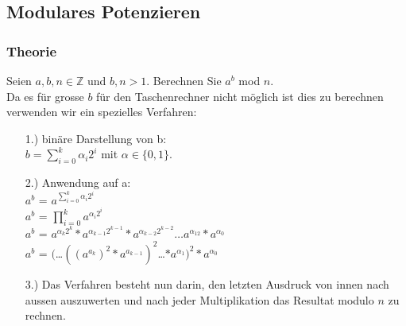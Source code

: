 \documentclass[10pt]{article}
\newcommand{\ZN}{\mathbb{Z}} %
\begin{document}
\subsection{Modulares Potenzieren}
\subsubsection{Theorie}
Seien $a,b,n \in \ZN$ und $b,n > 1$. Berechnen Sie $a^b$ mod $n$. \\
Da es für grosse $b$ für den Taschenrechner nicht möglich ist dies zu berechnen verwenden wir ein spezielles Verfahren:
\begin{itemize}
	\item[1.)] binäre Darstellung von b: \\
		$b=\sum_{i=0}^k \alpha_i2^i$ mit $\alpha \in \{0,1\}$.
	\item[2.)] Anwendung auf a: \\
		$a^b$ = $a^{\sum_{i=0}^k \alpha_i2^i}$\\
		$a^b$ = $\prod_{i=0}^{k} a^{\alpha_i2^i}$ \\
		$a^b$ = $a^{\alpha_k2^k}*a^{\alpha_{k-1}2^{k-1}}*a^{\alpha_{k-2}2^{k-2}} \dots  a^{\alpha_12}*a^{\alpha_0}$ \\
		$a^b$ = $($\dots$((a^{a_k})^2*a^{a_{k-1}})^2$\dots$*a^{\alpha_1})^2*a^{\alpha_0}$
	\item[3.)] Das Verfahren besteht nun darin, den letzten Ausdruck von innen nach aussen auszuwerten und nach jeder Multiplikation das Resultat modulo $n$ zu rechnen.
\end{itemize}
\end{document}
